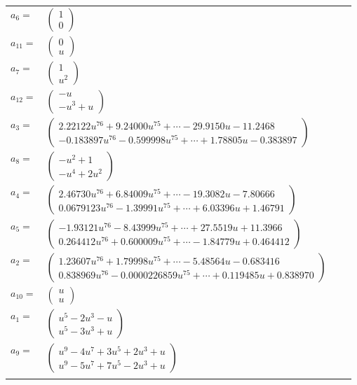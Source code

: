 \documentclass[1p]{elsarticle_modified}
\theoremstyle{definition}
\begin{document}
\begin{tabular}{m{7pt} m{180pt} m{7pt} m{180pt} }
\flushright $a_{6}=$&$\begin{pmatrix}1\\0\end{pmatrix}$ \\
\flushright $a_{11}=$&$\begin{pmatrix}0\\u\end{pmatrix}$ \\
\flushright $a_{7}=$&$\begin{pmatrix}1\\u^2\end{pmatrix}$ \\
\flushright $a_{12}=$&$\begin{pmatrix}- u\\- u^3+u\end{pmatrix}$ \\
\flushright $a_{3}=$&$\begin{pmatrix}2.22122 u^{76}+9.24000 u^{75}+\cdots-29.9150 u-11.2468\\-0.183897 u^{76}-0.599998 u^{75}+\cdots+1.78805 u-0.383897\end{pmatrix}$ \\
\flushright $a_{8}=$&$\begin{pmatrix}- u^2+1\\- u^4+2 u^2\end{pmatrix}$ \\
\flushright $a_{4}=$&$\begin{pmatrix}2.46730 u^{76}+6.84009 u^{75}+\cdots-19.3082 u-7.80666\\0.0679123 u^{76}-1.39991 u^{75}+\cdots+6.03396 u+1.46791\end{pmatrix}$ \\
\flushright $a_{5}=$&$\begin{pmatrix}-1.93121 u^{76}-8.43999 u^{75}+\cdots+27.5519 u+11.3966\\0.264412 u^{76}+0.600009 u^{75}+\cdots-1.84779 u+0.464412\end{pmatrix}$ \\
\flushright $a_{2}=$&$\begin{pmatrix}1.23607 u^{76}+1.79998 u^{75}+\cdots-5.48564 u-0.683416\\0.838969 u^{76}-0.0000226859 u^{75}+\cdots+0.119485 u+0.838970\end{pmatrix}$ \\
\flushright $a_{10}=$&$\begin{pmatrix}u\\u\end{pmatrix}$ \\
\flushright $a_{1}=$&$\begin{pmatrix}u^5-2 u^3- u\\u^5-3 u^3+u\end{pmatrix}$ \\
\flushright $a_{9}=$&$\begin{pmatrix}u^9-4 u^7+3 u^5+2 u^3+u\\u^9-5 u^7+7 u^5-2 u^3+u\end{pmatrix}$\\&\end{tabular}
\end{document}
